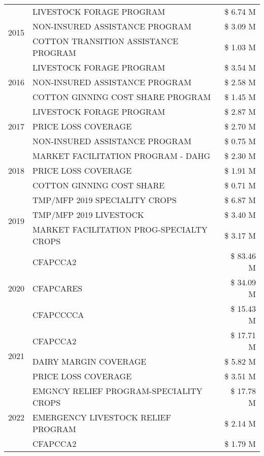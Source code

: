\begin{tabular}{llr}
\cline{1-3}
\multirow[t]{3}{*}{2015} & LIVESTOCK FORAGE PROGRAM & \$ 6.74 M \\
 & NON-INSURED ASSISTANCE PROGRAM & \$ 3.09 M \\
 & COTTON TRANSITION ASSISTANCE PROGRAM & \$ 1.03 M \\
\cline{1-3}
\multirow[t]{3}{*}{2016} & LIVESTOCK FORAGE PROGRAM & \$ 3.54 M \\
 & NON-INSURED ASSISTANCE PROGRAM & \$ 2.58 M \\
 & COTTON GINNING COST SHARE PROGRAM & \$ 1.45 M \\
\cline{1-3}
\multirow[t]{3}{*}{2017} & LIVESTOCK FORAGE PROGRAM & \$ 2.87 M \\
 & PRICE LOSS COVERAGE & \$ 2.70 M \\
 & NON-INSURED ASSISTANCE PROGRAM & \$ 0.75 M \\
\cline{1-3}
\multirow[t]{3}{*}{2018} & MARKET FACILITATION PROGRAM - DAHG & \$ 2.30 M \\
 & PRICE LOSS COVERAGE & \$ 1.91 M \\
 & COTTON GINNING COST SHARE & \$ 0.71 M \\
\cline{1-3}
\multirow[t]{3}{*}{2019} & TMP/MFP 2019 SPECIALITY CROPS & \$ 6.87 M \\
 & TMP/MFP 2019 LIVESTOCK & \$ 3.40 M \\
 & MARKET FACILITATION PROG-SPECIALTY CROPS & \$ 3.17 M \\
\cline{1-3}
\multirow[t]{3}{*}{2020} & CFAPCCA2 & \$ 83.46 M \\
 & CFAPCARES & \$ 34.09 M \\
 & CFAPCCCCA & \$ 15.43 M \\
\cline{1-3}
\multirow[t]{3}{*}{2021} & CFAPCCA2 & \$ 17.71 M \\
 & DAIRY MARGIN COVERAGE & \$ 5.82 M \\
 & PRICE LOSS COVERAGE & \$ 3.51 M \\
\cline{1-3}
\multirow[t]{3}{*}{2022} & EMGNCY RELIEF PROGRAM-SPECIALITY CROPS & \$ 17.78 M \\
 & EMERGENCY LIVESTOCK RELIEF PROGRAM & \$ 2.14 M \\
 & CFAPCCA2 & \$ 1.79 M \\
\cline{1-3}
\bottomrule
\end{tabular}
